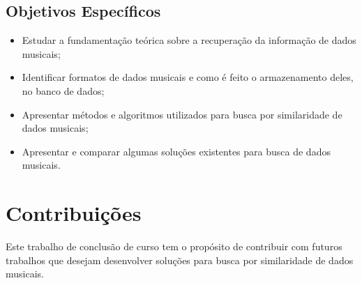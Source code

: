 \subsection{Objetivos Específicos}
 \begin{itemize}
   \item Estudar a fundamentação teórica sobre a recuperação da informação de dados musicais;
   \item Identificar formatos de dados musicais e como é feito o armazenamento deles, no banco de dados;
   \item Apresentar métodos e algoritmos utilizados para busca por similaridade de dados musicais;
   \item Apresentar e comparar algumas soluções existentes para busca de dados musicais.
 \end{itemize}

\section{Contribuições}
Este trabalho de conclusão de curso tem o propósito de contribuir com futuros trabalhos que desejam desenvolver soluções para busca por similaridade de dados musicais.